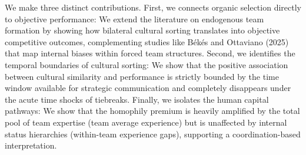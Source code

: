 \documentclass[10pt]{article}
\begin{document}
We make three distinct contributions. First,  we connects organic selection directly to objective performance: We extend the literature on endogenous team formation by showing how bilateral cultural sorting translates into objective competitive outcomes, complementing studies like Békés and Ottaviano (2025) that map internal biases within forced team structures. Second, we identifies the temporal boundaries of cultural sorting: We show that the positive association between cultural similarity and performance is strictly bounded by the time window available for strategic communication and completely disappears under the acute time shocks of tiebreaks. Finally, we isolates the human capital pathways: We show that the homophily premium is heavily amplified by the total pool of team expertise (team average experience) but is unaffected by internal status hierarchies (within-team experience gaps), supporting a coordination-based interpretation.

\end{document}
